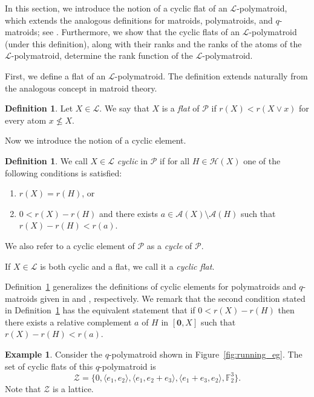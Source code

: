 \documentclass[a4paper,11pt,reqno]{article}
\theoremstyle{definition}
\newtheorem{definition}[theorem]{{{Definition}}}
\newtheorem{example}[theorem]{{{Example}}}
\newcommand{\mL}{\mathcal{L}}
\newcommand{\mP}{\mathcal{P}}
\newcommand{\mH}{\mathcal{H}}
\newcommand{\zero}{{\mathbf{0}}}
\begin{document}
In this section, we introduce the notion of a cyclic flat of an $\mL$-polymatroid, which extends the analogous definitions for matroids, polymatroids, and $q$-matroids; see \cite{AlfByr22,bonin_demier,Csirm20}. Furthermore, we show that the cyclic flats of an $\mL$-polymatroid (under this definition), along with their ranks and the ranks of the atoms of the $\mL$-polymatroid, determine the rank function of the $\mL$-polymatroid.

First, we define a flat of an $\mL$-polymatroid. The definition extends naturally from the analogous concept in matroid theory.

\begin{definition}
    Let $X\in\mathcal{L}$. We say that $X$ is a \emph{flat} of $\mP$ if $r(X)<r(X\vee x)$ for every atom $x\not\leq X$.
\end{definition}

Now we introduce the notion of a cyclic element. 

\begin{definition}\label{def:cyclic_space}
We call $X\in\mathcal{L}$ \emph{cyclic} in $\mP$ if for all $H\in\mH(X)$ one of the following conditions is satisfied:
\begin{enumerate}
    \item $r(X)=r(H)$, or
    \item $0<r(X)-r(H)$ and there exists $a\in\mathcal{A}(X)\setminus\mathcal{A}(H)$ such that $r(X)-r(H)<r(a)$.
\end{enumerate}
We also refer to a cyclic element of $\mP$ as a \emph{cycle} of $\mP$.
\end{definition}

If $X\in\mathcal{L}$ is both cyclic and a flat, we call it a {\em cyclic flat}.

Definition~\ref{def:cyclic_space} generalizes the definitions of cyclic elements for polymatroids and $q$-matroids given in \cite{Csirm20} and \cite{AlfByr22}, respectively.
We remark that the second condition stated in Definition~\ref{def:cyclic_space} has the equivalent statement that if 
$0<r(X)-r(H)$ then there exists a relative complement $a$ of $H$ in $[\zero, X]$ such that $r(X)-r(H)<r(a)$.

\begin{example}
    Consider the $q$-polymatroid shown in Figure~\ref{fig:running_eg}. The set of cyclic flats of this $q$-polymatroid is
    $$\mathcal{Z}=\{0,\langle e_1, e_2\rangle, \langle e_1, e_2+e_3\rangle,\langle e_1+e_3, e_2\rangle, \mathbb{F}_2^3\}.$$
    Note that $\mathcal{Z}$ is a lattice.
\end{example}
\end{document}
